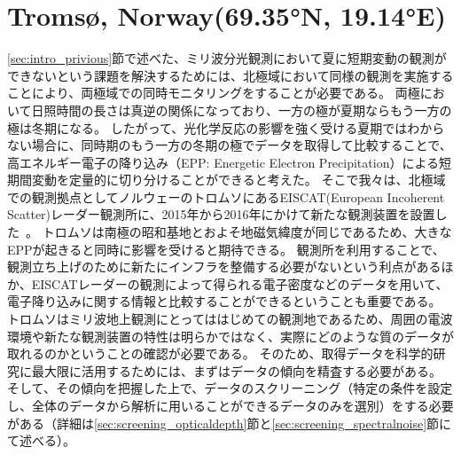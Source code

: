 \section{Troms\o , Norway(69.35°N, 19.14°E)}
\label{sec:mm_tromsoe}
\ref{sec:intro_privious}節で述べた、ミリ波分光観測において夏に短期変動の観測ができないという課題を解決するためには、北極域において同様の観測を実施することにより、両極域での同時モニタリングをすることが必要である。
両極において日照時間の長さは真逆の関係になっており、一方の極が夏期ならもう一方の極は冬期になる。
したがって、光化学反応の影響を強く受ける夏期ではわからない場合に、同時期のもう一方の冬期の極でデータを取得して比較することで、高エネルギー電子の降り込み（EPP: Energetic Electron Precipitation）による短期間変動を定量的に切り分けることができると考えた。
そこで我々は、北極域での観測拠点としてノルウェーのトロムソにあるEISCAT(European Incoherent Scatter)レーダー観測所に、2015年から2016年にかけて新たな観測装置を設置した~\cite{ito2017master}。
トロムソは南極の昭和基地とおよそ地磁気緯度が同じであるため、大きなEPPが起きると同時に影響を受けると期待できる。
観測所を利用することで、観測立ち上げのために新たにインフラを整備する必要がないという利点があるほか、EISCATレーダーの観測によって得られる電子密度などのデータを用いて、電子降り込みに関する情報と比較することができるということも重要である。
トロムソはミリ波地上観測にとってははじめての観測地であるため、周囲の電波環境や新たな観測装置の特性は明らかではなく、実際にどのような質のデータが取れるのかということの確認が必要である。
そのため、取得データを科学的研究に最大限に活用するためには、まずはデータの傾向を精査する必要がある。
そして、その傾向を把握した上で、データのスクリーニング（特定の条件を設定し、全体のデータから解析に用いることができるデータのみを選別）をする必要がある（詳細は\ref{sec:screening_opticaldepth}節と\ref{sec:screening_spectralnoise}節にて述べる）。


